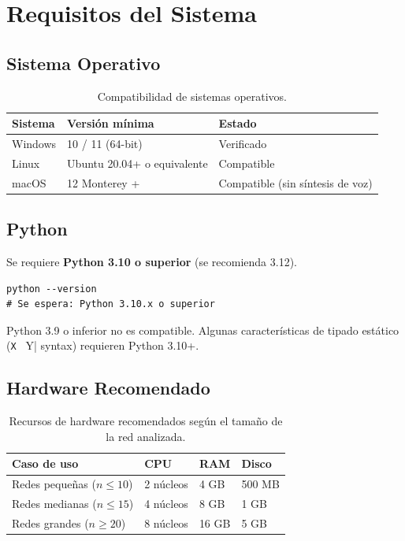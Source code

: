 \section{Requisitos del Sistema}
\label{sec:requisitos}

\subsection{Sistema Operativo}

\begin{table}[H]
    \centering
    \caption{Compatibilidad de sistemas operativos.}
    \begin{tabular}{lll}
        \toprule
        \textbf{Sistema} & \textbf{Versión mínima} & \textbf{Estado} \\
        \midrule
        Windows & 10 / 11 (64-bit) & Verificado \\
        Linux   & Ubuntu 20.04+ o equivalente & Compatible \\
        macOS   & 12 Monterey + & Compatible (sin síntesis de voz) \\
        \bottomrule
    \end{tabular}
\end{table}

\subsection{Python}

Se requiere \textbf{Python 3.10 o superior} (se recomienda 3.12).

\begin{lstlisting}[style=shell, caption={Verificar versión de Python.}]
python --version
# Se espera: Python 3.10.x o superior
\end{lstlisting}

\begin{aviso}
Python 3.9 o inferior no es compatible. Algunas características de tipado estático (\lstinline|X | Y| syntax) requieren Python 3.10+.
\end{aviso}

\subsection{Hardware Recomendado}

\begin{table}[H]
    \centering
    \caption{Recursos de hardware recomendados según el tamaño de la red analizada.}
    \begin{tabular}{llll}
        \toprule
        \textbf{Caso de uso} & \textbf{CPU} & \textbf{RAM} & \textbf{Disco} \\
        \midrule
        Redes pequeñas ($n \leq 10$)  & 2 núcleos & 4 GB  & 500 MB \\
        Redes medianas ($n \leq 15$)  & 4 núcleos & 8 GB  & 1 GB   \\
        Redes grandes ($n \geq 20$)   & 8 núcleos & 16 GB & 5 GB   \\
        \bottomrule
    \end{tabular}
\end{table}

